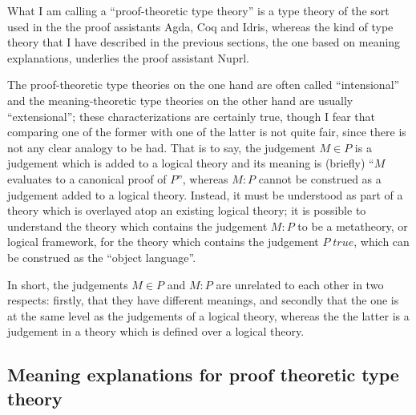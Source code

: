 \documentclass{amsart}
\theoremstyle{definition}
\theoremstyle{remark}
\numberwithin{equation}{section}
\newcommand\istrue[1]{\ensuremath{#1\;\mathit{true}}}
\newcommand\ver[2]{\ensuremath{#1\in#2}}
\newcommand\reduce[2]{\ensuremath{#1\Rightarrow#2}}
\begin{document}
What I am calling a ``proof-theoretic type theory'' is a type theory of the
sort used in the the proof assistants Agda, Coq and Idris, whereas the kind of
type theory that I have described in the previous sections, the one based on
meaning explanations, underlies the proof assistant Nuprl.

The proof-theoretic type theories on the one hand are often called
``intensional'' and the meaning-theoretic type theories on the other hand are
usually ``extensional''; these characterizations are certainly true, though I
fear that comparing one of the former with one of the latter is not quite fair,
since there is not any clear analogy to be had. That is to say, the judgement
\ver{M}{P} is a judgement which is added to a logical theory and its meaning is
(briefly) ``$M$ evaluates to a canonical proof of $P$'', whereas $M:P$ cannot
be construed as a judgement added to a logical theory. Instead, it must be
understood as part of a theory which is overlayed atop an existing logical
theory; it is possible to understand the theory which contains the judgement
$M:P$ to be a metatheory, or logical framework, for the theory which contains
the judgement \istrue{P}, which can be construed as the ``object language''.

In short, the judgements \ver{M}{P} and $M:P$ are unrelated to each other in
two respects: firstly, that they have different meanings, and secondly that the
one is at the same level as the judgements of a logical theory, whereas the the
latter is a judgement in a theory which is defined over a logical theory.

\subsection{Meaning explanations for proof theoretic type theory}

\end{document}
